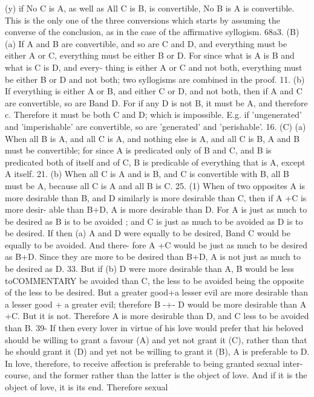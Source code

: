 {{{{{{{{(y) if No C is A, as well as All C is B, is convertible, No B is A is
convertible. This is the only one of the three conversions which
starts by assuming the converse of the conclusion, as in the case
of the affirmative syllogism.
68a3. (B) (a) If A and B are convertible, and so are C and D,
and everything must be either A or C, everything must be either
B or D. For since what is A is B and what is C is D, and every-
thing is either A or C and not both, everything must be either B
or D and not both; two syllogisms are combined in the proof.
11. (b) If everything is either A or B, and either C or D, and
not both, then if A and C are convertible, so are Band D. For if
any D is not B, it must be A, and therefore c. Therefore it must
be both C and D; which is impossible. E.g. if 'ungenerated' and
'imperishable' are convertible, so are 'generated' and 'perishable'.
16. (C) (a) When all B is A, and all C is A, and nothing else
is A, and all C is B, A and B must be convertible; for since A is
predicated only of B and C, and B is predicated both of itself and
of C, B is predicable of everything that is A, except A itself.
21. (b) When all C is A and is B, and C is convertible with B,
all B must be A, because all C is A and all B is C.
25. (1) When of two opposites A is more desirable than B, and
D similarly is more desirable than C, then if A +C is more desir-
able than B+D, A is more desirable than D. For A is just as
much to be desired as B is to be avoided ; and C is just as much to
be avoided as D is to be desired. If then (a) A and D were equally
to be desired, Band C would be equally to be avoided. And there-
fore A +C would be just as much to be desired as B+D. Since
they are more to be desired than B+D, A is not just as much to
be desired as D.
33. But if (b) D were more desirable than A, B would be less toCOMMENTARY
be avoided than C, the less to be avoided being the opposite of the
less to be desired. But a greater good+a lesser evil are more
desirable than a lesser good + a greater evil; therefore B -+- D would
be more desirable than A +C. But it is not. Therefore A is more
desirable than D, and C less to be avoided than B.
39- If then every lover in virtue of his love would prefer that
his beloved should be willing to grant a favour (A) and yet not
grant it (C), rather than that he should grant it (D) and yet not
be willing to grant it (B), A is preferable to D. In love, therefore,
to receive affection is preferable to being granted sexual inter-
course, and the former rather than the latter is the object of love.
And if it is the object of love, it is its end. Therefore sexual
}}}}}}}}

